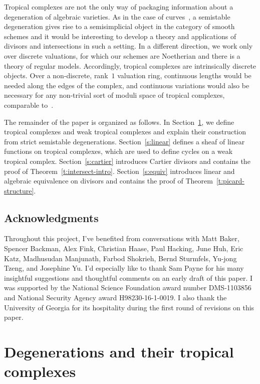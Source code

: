 \documentclass[11pt,reqno]{amsart}
\theoremstyle{definition}
\begin{document}
Tropical complexes are not the only way of packaging information about a
degeneration of algebraic varieties. As in the case of
curves~\cites{amini-baker,katz-zureick-brown}, a semistable degeneration gives
rise to a semisimplicial object in the category of smooth schemes and it would
be interesting to develop a theory and applications of divisors and
intersections in such a setting. In a different direction, we work only over
discrete valuations, for which our schemes are Noetherian and there is a theory
of regular models. Accordingly, tropical complexes are intrinsically discrete
objects. Over a non-discrete, rank~$1$ valuation ring, continuous lengths would
be needed along the edges of the complex, and continuous variations would also
be necessary for any non-trivial sort of moduli space of tropical complexes,
comparable to~\cite{brannetti-melo-viviani}. 

The remainder of the paper is organized as follows. In
Section~\ref{s:complexes}, we define tropical complexes and weak tropical
complexes and explain their construction from strict semistable degenerations.
Section~\ref{s:linear} defines a sheaf of linear functions on tropical
complexes, which are used to define cycles on a weak tropical complex.
Section~\ref{s:cartier} introduces Cartier divisors and contains the proof of
Theorem~\ref{t:intersect-intro}. Section~\ref{s:equiv} introduces linear and
algebraic equivalence on divisors and contains the proof of
Theorem~\ref{t:picard-structure}.

\subsection*{Acknowledgments}

Throughout this project, I've benefited from conversations with Matt Baker,
Spencer Backman, Alex Fink, Christian Haase, Paul Hacking, June Huh, Eric Katz,
Madhusudan Manjunath, Farbod Shokrieh, Bernd Sturmfels, Yu-jong Tzeng, and
Josephine Yu. I'd especially like to thank Sam Payne for his many insightful
suggestions and thoughtful comments on an early draft of this paper. I was
supported by the National Science Foundation award number DMS-1103856 and
National Security Agency award H98230-16-1-0019. I also thank
the University of Georgia for its hospitality during the first round
of revisions on this paper.

\section{Degenerations and their tropical complexes}\label{s:complexes}
\end{document}
